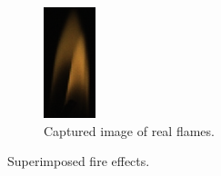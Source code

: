 \begin{figure}[ht!]
        \begin{subfigure}[t]{0.135\textwidth}
                \includegraphics[width=\textwidth]{img/vox0087}
                \caption{Captured image of real flames.}
                \label{fig:vox0087}
        \end{subfigure}
        \caption{Superimposed fire effects.}
\end{figure}